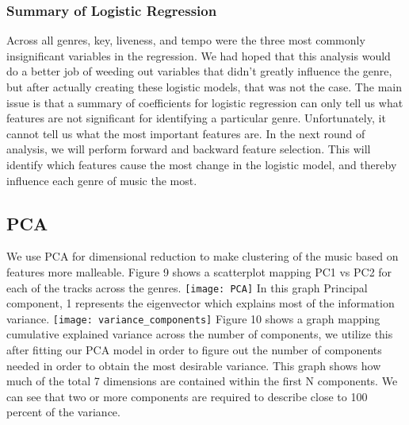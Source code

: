 \documentclass[11pt, a4paper, twocolumn]{article}
\begin{document}
\subsubsection{Summary of Logistic Regression} 
Across all genres, key, liveness, and tempo were the three most commonly insignificant variables in the regression. We had hoped that this analysis would do a better job of weeding out variables that didn't greatly influence the genre, but after actually creating these logistic models, that was not the case.
The main issue is that a summary of coefficients for logistic regression can only tell us what features are not significant for identifying a particular genre. Unfortunately, it cannot tell us what the most important features are. In the next round of analysis, we will perform forward and backward feature selection. This will identify which features cause the most change in the logistic model, and thereby influence each genre of music the most.
\subsection{PCA}
We use PCA for dimensional reduction to make clustering of the music based on features more malleable. Figure 9 shows a scatterplot mapping PC1 vs PC2 for each of the tracks across the genres. 
\texttt{[image: PCA]}
In this graph Principal component, 1 represents the eigenvector which explains most of the information variance.
\texttt{[image: variance\_components]}
Figure 10 shows a graph mapping cumulative explained variance across the number of components, we utilize this after fitting our PCA model in order to figure out the number of components needed in order to obtain the most desirable variance. This graph shows how much of the total 7 dimensions are contained within the first N components. We can see that two or more components are required to describe close to 100 percent of the variance. 
\end{document}
